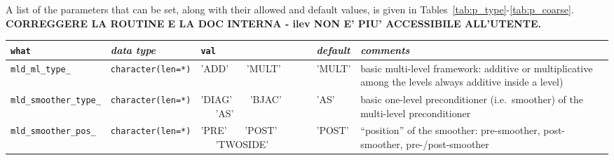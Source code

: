 A list of the parameters that can be set, along with their allowed and
default values, is given in Tables~\ref{tab:p_type}-\ref{tab:p_coarse}. 
\textbf{CORREGGERE LA ROUTINE E LA DOC INTERNA - ilev NON E' PIU'
ACCESSIBILE ALL'UTENTE.}


\begin{sidewaystable}
\begin{center}
\begin{tabular}{|l|l|p{2cm}|l|p{7cm}|}
\hline
\verb|what|              & \emph{data type}        &  \verb|val|      &  \emph{default}  &
\emph{comments} \\ \hline
\verb|mld_ml_type_|      & \verb|character(len=*)|
                         & 'ADD' \ \ \ 'MULT'   
                         & 'MULT'
                         & basic multi-level framework: additive or multiplicative
                           among the levels always additive inside a level)         \\  
\verb|mld_smoother_type_|& \verb|character(len=*)|
                         & 'DIAG' \ \ \ 'BJAC' \ \ \ 'AS'
                         & 'AS'
                         & basic one-level preconditioner (i.e.\ smoother) of the
                           multi-level preconditioner \\
\verb|mld_smoother_pos_| & \verb|character(len=*)|
                         & 'PRE' \ \ \ 'POST' \ \ \ 'TWOSIDE'
                         & 'POST'
                         & ``position'' of the smoother: pre-smoother, post-smoother, 
                           pre-/post-smoother \\
\hline
\end{tabular}
\end{center}
\caption{Parameters defining the type of multi-level preconditioner.
\label{tab:p_type}}                       
\end{sidewaystable}
                   
